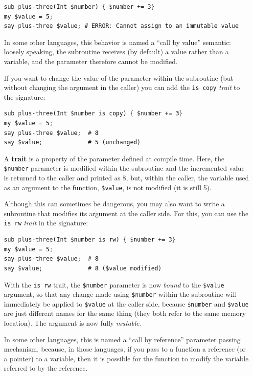 \begin{verbatim}
sub plus-three(Int $number) { $number += 3}
my $value = 5;
say plus-three $value; # ERROR: Cannot assign to an immutable value
\end{verbatim}

In some other languages, this behavior is named a ``call 
by value'' semantic: loosely speaking, the subroutine 
receives (by default) a value rather than a variable, and 
the parameter therefore cannot be modified.

If you want to change the value of the parameter within the 
subroutine (but without changing the argument in the caller) 
you can add the {\tt is copy} \emph{trait} to the signature:

\begin{verbatim}
sub plus-three(Int $number is copy) { $number += 3}
my $value = 5;
say plus-three $value;  # 8
say $value;             # 5 (unchanged)
\end{verbatim}
%
A {\bf trait} is a property of the parameter defined at compile time. 
Here, the {\tt \$number} parameter is modified within the 
subroutine and the incremented value is returned to the caller 
and printed as 8, but, within the caller, the variable used
as an argument to the function, {\tt \$value}, is not 
modified (it is still 5).

Although this can sometimes be dangerous, you may also want 
to write a subroutine that modifies its argument at the caller 
side. For this, you can use the {\tt is rw} \emph{trait} 
in the signature:

\begin{verbatim}
sub plus-three(Int $number is rw) { $number += 3}
my $value = 5;
say plus-three $value;  # 8
say $value;             # 8 ($value modified)
\end{verbatim}
%
With the {\tt is rw} trait, the {\tt \$number} parameter is 
now  \emph{bound} to the {\tt \$value} argument, so that any change 
made using {\tt \$number} within the subroutine will immediately 
be applied to {\tt \$value} at the caller side, because {\tt \$number} 
and {\tt \$value} are just different names for the same thing (they 
both refer to the same memory location). The argument is now 
fully \emph{mutable}.

In some other languages, this is named a ``call by reference'' 
parameter passing mechanism, because, in those languages, if you 
pass to a function  a reference (or a pointer) to a variable, then 
it is possible for the function to modify the variable referred 
to by the reference.


